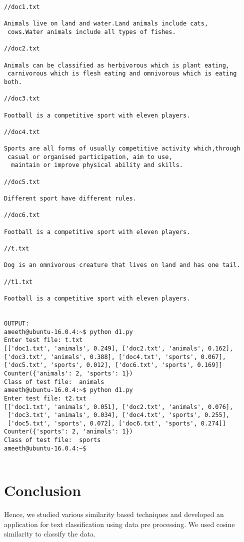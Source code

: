 \documentclass[10pt,a4paper]{article}
\begin{document}
\begin{verbatim}
//doc1.txt

Animals live on land and water.Land animals include cats,
 cows.Water animals include all types of fishes.

//doc2.txt

Animals can be classified as herbivorous which is plant eating,
 carnivorous which is flesh eating and omnivorous which is eating both.

//doc3.txt

Football is a competitive sport with eleven players.

//doc4.txt

Sports are all forms of usually competitive activity which,through
 casual or organised participation, aim to use,
  maintain or improve physical ability and skills.

//doc5.txt

Different sport have different rules.

//doc6.txt

Football is a competitive sport with eleven players.

//t.txt

Dog is an omnivorous creature that lives on land and has one tail.

//t1.txt

Football is a competitive sport with eleven players.


OUTPUT:
ameeth@ubuntu-16.0.4:~$ python d1.py
Enter test file: t.txt
[['doc1.txt', 'animals', 0.249], ['doc2.txt', 'animals', 0.162], 
['doc3.txt', 'animals', 0.388], ['doc4.txt', 'sports', 0.067], 
['doc5.txt', 'sports', 0.012], ['doc6.txt', 'sports', 0.169]]
Counter({'animals': 2, 'sports': 1})
Class of test file:  animals
ameeth@ubuntu-16.0.4:~$ python d1.py
Enter test file: t2.txt
[['doc1.txt', 'animals', 0.051], ['doc2.txt', 'animals', 0.076],
 ['doc3.txt', 'animals', 0.034], ['doc4.txt', 'sports', 0.255], 
 ['doc5.txt', 'sports', 0.072], ['doc6.txt', 'sports', 0.274]]
Counter({'sports': 2, 'animals': 1})
Class of test file:  sports
ameeth@ubuntu-16.0.4:~$ 


\end{verbatim}
\section{Conclusion}
Hence, we studied various similarity based techniques and developed an application for text classification using data pre processing. We used cosine similarity to classify the data.
\end{document}
